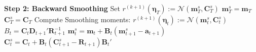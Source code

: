 \documentclass[APA,STIX1COL]{WileyNJD-v2}
\begin{document}
\begin{algorithm}
\begin{algorithmic}
\State \textbf{Step 2: Backward Smoothing}
        \State Set $r^{(k+1)}(\boldsymbol{\eta}_T) := \mathcal{N}(\mathbf{m}_T^s, \mathbf{C}_T^s)$
        \State $\mathbf{m}_T^s = \mathbf{m}_T$
        \State $\mathbf{C}_T^s = \mathbf{C}_T$
    \Else
        \State Compute Smoothing moments:
        \State $r^{(k+1)}(\boldsymbol{\eta}_t) := \mathcal{N}(\mathbf{m}_t^s, \mathbf{C}_t^s)$
        \State $B_t = \mathbf{C}_t \mathbf{D}_{t+1}' \mathbf{R}_{t+1}^{-1}$
        \State $\mathbf{m}_t^s = \mathbf{m}_t + \mathbf{B}_t (\mathbf{m}_{t+1}^s - \mathbf{a}_{t+1})$
        \State $\mathbf{C}_t^s = \mathbf{C}_t + \mathbf{B}_t (\mathbf{C}_{t+1}^s - \mathbf{R}_{t+1}) \mathbf{B}_t'$
    \EndIf
\EndFor


\end{algorithmic}
\end{algorithm}


\clearpage

%

\end{document}
